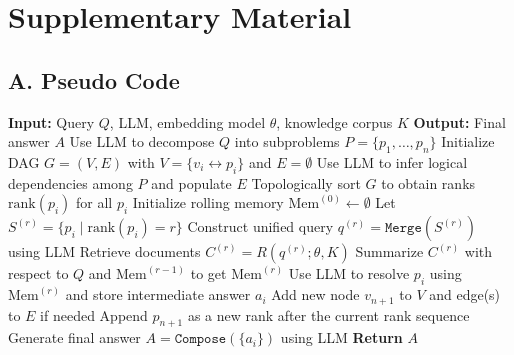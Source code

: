 


\section{Supplementary Material}
\label{app:myappendix}  




\subsection{A. Pseudo Code}

\begin{algorithm}[hpt]
\caption{LogicRAG: Logic-Aware Retrieval-Augmented Generation}
\label{alg:logicrag}
\begin{algorithmic}[1]
\State \textbf{Input:} Query $Q$, LLM, embedding model $\theta$, knowledge corpus $K$
\State \textbf{Output:} Final answer $A$
\State Use LLM to decompose $Q$ into subproblems $P = \{p_1, \dots, p_n\}$
\State Initialize DAG $G = (V, E)$ with $V = \{v_i \leftrightarrow p_i\}$ and $E = \emptyset$
\State Use LLM to infer logical dependencies among $P$ and populate $E$
\State Topologically sort $G$ to obtain ranks $\text{rank}(p_i)$ for all $p_i$
\State Initialize rolling memory $\text{Mem}^{(0)} \gets \emptyset$
    \State Let $S^{(r)} = \{p_i \mid \text{rank}(p_i) = r\}$ 
    \State Construct unified query $q^{(r)} = \texttt{Merge}(S^{(r)})$ using LLM
    \State Retrieve documents $C^{(r)} = R(q^{(r)}; \theta, K)$ 
    \State Summarize $C^{(r)}$ with respect to $Q$ and $\text{Mem}^{(r-1)}$ to get $\text{Mem}^{(r)}$
        \State Use LLM to resolve $p_i$ using $\text{Mem}^{(r)}$ and store intermediate answer $a_i$
    \EndFor
        \State Add new node $v_{n+1}$ to $V$ and edge(s) to $E$ if needed
        \State Append $p_{n+1}$ as a new rank after the current rank sequence
    \EndIf
\EndFor
\State Generate final answer $A = \texttt{Compose}(\{a_i\})$ using LLM
\State \textbf{Return} $A$
\end{algorithmic}
\end{algorithm}




